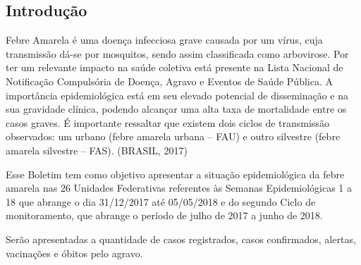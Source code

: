 \documentclass{article}
\begin{document}
\justifying
\begin{multicols*}{2} %







\section*{Introdução} %







{\large %


     Febre Amarela é uma doença infecciosa grave causada por um vírus, cuja transmissão dá-se por mosquitos, sendo assim classificada como arbovirose. Por ter um relevante impacto na saúde coletiva está presente na Lista Nacional de Notificação Compulsória de Doença, Agravo e Eventos de Saúde Pública. A importância epidemiológica está em seu elevado potencial de disseminação e na sua gravidade clínica, podendo alcançar uma alta taxa de mortalidade entre os casos graves. É importante ressaltar que existem dois ciclos de transmissão observados: um urbano (febre amarela urbana – FAU) e outro silvestre (febre amarela silvestre – FAS). (BRASIL, 2017)
    
	Esse Boletim tem como objetivo apresentar a situação epidemiológica da febre amarela nas 26 Unidades Federativas referentes às Semanas Epidemiológicas 1 a 18 que abrange o dia 31/12/2017 até 05/05/2018 e do segundo Ciclo de monitoramento, que abrange o período de julho de 2017 a junho de 2018.
    
	Serão apresentadas a quantidade de casos registrados, casos confirmados, alertas, vacinações e óbitos pelo agravo.
	
}
\end{multicols*}
\end{document}
